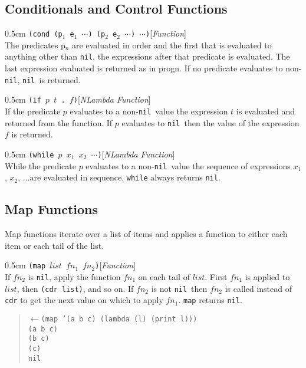 \documentclass[a4paper]{article}
\newcommand{\lisp}[1]{\texttt{#1}}
\newcommand{\NIL}{\lisp{nil}}
\newcommand{\xargs}{$x_{1}$ $x_{2}$ $\cdots$}
\newcommand{\largs}{$x_{1}$, $x_{2}$, $\ldots$}
\newenvironment{defun}[2]{\begin{adjustwidth}{0.5cm}{}
    {\hspace*{-0.5cm}\lisp{#2}\hfill[\textit{#1}]\\}}
               {\end{adjustwidth}}
\begin{document}
\subsection{Conditionals and Control Functions}

\begin{defun}{Function}{(cond (p$_{1}$ e$_{1}$ $\cdots$) (p$_{2}$ e$_{2}$ $\cdots$)
    $\cdots$)} The predicates p$_{n}$ are evaluated in order
  and the first that is evaluated to anything other than \NIL, the
  expressions after that predicate is evaluated.  The last expression
  evaluated is returned as in progn.  If no predicate evaluates to
  non-\NIL, \NIL\ is returned.
\end{defun}


\begin{defun}{NLambda Function}{(if $p$ $t$ . $f$)}
  If the predicate $p$ evaluates to a non-\NIL\ value the expression
  $t$ is evaluated and returned from the function. If $p$ evaluates to
  \NIL\ then the value of the expression $f$ is returned.
\end{defun}

\begin{defun}{NLambda Function}{(while $p$ \xargs)}
  While the predicate $p$ evaluates to a non-\NIL\ value the sequence
  of expressions \largs are evaluated in sequence. \lisp{while} always
  returns \NIL.
\end{defun}

\subsection{Map Functions}
Map functions iterate over a list of items and applies a function to
either each item or each tail of the list.

\begin{defun}{Function}{(map $list$ $fn_{1}$ $fn_{2}$)}
  If $fn_{2}$ is \NIL, apply the function $fn_{1}$ on each tail of
  $list$. First $fn_{1}$ is applied to $list$, then \lisp{(cdr list)},
  and so on. If $fn_{2}$ is not \NIL\ then $fn_{2}$ is called instead
  of \lisp{cdr} to get the next value on which to apply $fn_{1}$.
  \lisp{map} returns \NIL.

  \begin{quote}
    \lisp{$\leftarrow$(map '(a b c) (lambda (l) (print l)))}\\
    \lisp{(a b c)}\\
    \lisp{(b c)}\\
    \lisp{(c)}\\
    \NIL
  \end{quote}

\end{defun}
\end{document}

